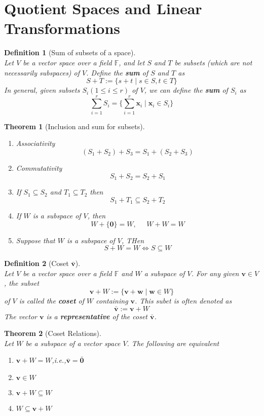 \documentclass[12pt]{article}
\newtheorem{definition}{Definition}[section]
\newtheorem{theorem}{Theorem}[section]
\theoremstyle{definition}
\begin{document}
\section{Quotient Spaces and Linear Transformations}
\begin{definition}[Sum of subsets of a space]
\hfill\\\normalfont Let $V$ be a vector space over a field $\mathbb{F}$, and let $S$ and $T$ be subsets (which are not necessarily subspaces) of $V$. Define the \textbf{sum} of $S$ and $T$ as
\[
S+T:=\{s+t\mid s\in S, t\in T\}
\]
In general, given subsets $S_i(1\leq i\leq r)$ of $V$, we can define the \textbf{sum} of $S_i$ as
\[
\sum_{i=1}^r S_i = \{\sum_{i=1}^r \mathbf{x}_i\mid \mathbf{x}_i\in S_i\}
\]
\end{definition}
\begin{theorem}[Inclusion and sum for subsets]
\begin{enumerate}[label=(\arabic*)]
\item Associativity
\[
(S_1+S_2)+S_3= S_1+(S_2+S_3)
\]
\item Commutativity
\[
S_1+S_2=S_2+S_1
\]
\item If $S_1\subseteq S_2$ and $T_1\subseteq T_2$ then
\[
S_1+T_1\subseteq S_2+T_2
\]
\item If $W$ is a subspace of $V$, then
\[
W+\{\mathbf{0}\}=W,\;\;\;\;\;W+W=W
\]
\item Suppose that $W$ is a subspace of $V$, THen
\[
S+W=W\Leftrightarrow S\subseteq W
\]
\end{enumerate}
\end{theorem}
\begin{definition}[Coset $\bar{\mathbf{v}}$]
\hfill\\\normalfont Let $V$ be a vector space over a field $\mathbb{F}$ and $W$ a subspace of $V$. For any given $\mathbf{v}\in V$, the subset
\[
\mathbf{v}+W:=\{\mathbf{v}+\mathbf{w}\mid \mathbf{w}\in W\}
\]
of $V$ is called the \textbf{coset} of $W$ containing $\mathbf{v}$. This subet is often denoted as
\[
\bar{\mathbf{v}}:=\mathbf{v}+W
\]
The vector $\mathbf{v}$ is a \textbf{representative} of the coset $\bar{\mathbf{v}}$.
\end{definition}
\begin{theorem}[Coset Relations]
\hfill\\\normalfont Let $W$ be a subspace of a vector space $V$. The following are equivalent
\begin{enumerate}[label=(\arabic*)]
\item $\mathbf{v}+W=W$,i.e.,$\bar{\mathbf{v}}=\bar{\mathbf{0}}$
\item $\mathbf{v}\in W$
\item $\mathbf{v}+W\subseteq W$
\item $W\subseteq \mathbf{v}+W$
\end{enumerate}
\end{theorem}
\end{document}
